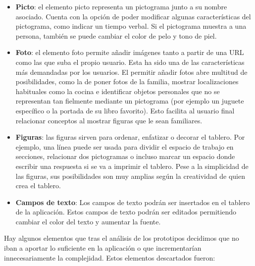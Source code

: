 \begin{itemize}
	
	
	\item \textbf{Picto}: el elemento picto representa un pictograma junto a su nombre asociado. Cuenta con la opción de poder modificar algunas características del pictograma, como indicar un tiempo verbal. Si el pictograma muestra a una persona, también se puede cambiar el color de pelo y tono de piel.
	
	\item \textbf{Foto}: el elemento foto permite añadir imágenes tanto a partir de una URL como las que suba el propio usuario. Esta ha sido una de las características más demandadas por los usuarios. El permitir añadir fotos abre multitud de posibilidades, como la de poner fotos de la familia, mostrar localizaciones habituales como la cocina e identificar objetos personales que no se representan tan fielmente mediante un pictograma (por ejemplo un juguete específico o la portada de su  libro favorito). Esto facilita al usuario final relacionar conceptos al mostrar figuras que le sean familiares.
	
	\item \textbf{Figuras}: las figuras sirven para ordenar, enfatizar o decorar el tablero. Por ejemplo,  una línea puede ser usada para dividir el espacio de trabajo en secciones, relacionar dos pictogramas o incluso marcar un espacio donde escribir una respuesta si se va a imprimir el tablero. Pese a la simplicidad de las figuras, sus posibilidades son muy amplias según  la creatividad de quien crea el tablero.
	
	\item \textbf{Campos de texto}: Los campos de texto podrán ser insertados en el tablero de la aplicación. Estos campos de texto podrán ser editados permitiendo cambiar el color del texto y aumentar la fuente.
		
\end{itemize}

Hay algunos elementos que tras el análisis de los prototipos decidimos que no iban a aportar lo suficiente en la aplicación o que incrementarían innecesariamente la complejidad. Estos elementos descartados fueron:

